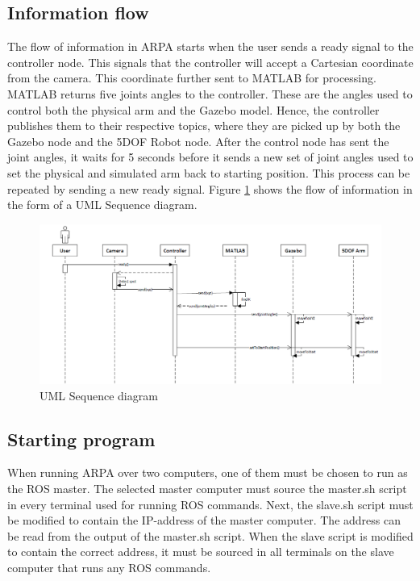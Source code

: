 \documentclass[11pt,a4paper, titlepage]{article}
\begin{document}
\subsection{Information flow}
The flow of information in ARPA starts when the user sends a ready signal to the controller node. This signals that the controller will accept a Cartesian coordinate from the camera. This coordinate  further sent to MATLAB for processing. MATLAB returns five joints angles to the controller. These are the angles used to control both the physical arm and the Gazebo model. Hence, the controller publishes them to their respective topics, where they are picked up by both the Gazebo node and the 5DOF Robot node. After the control node has sent the joint angles, it waits for 5 seconds before it sends a new set of joint angles used to set the physical and simulated arm back to starting position. This process can be repeated by sending a new ready signal. Figure \ref{fig:seq-diagram} shows the flow of information in the form of a UML Sequence diagram.
	
	
	\begin{figure}[H]
		\includegraphics[width=\linewidth]{../Diagrams/SequenceDiagram-v1.png}
		\caption{UML Sequence diagram}
		\label{fig:seq-diagram}
	\end{figure}
	
	\subsection{Starting program}
	\label{startup}
	
	When running ARPA over two computers, one of them must be chosen to run as the ROS master. The selected master computer must source the master.sh script in every terminal used for running ROS commands. Next, the slave.sh script must be modified to contain the IP-address of the master computer. The address can be read from the output of the master.sh script. When the slave script is modified to contain the correct address, it must be sourced in all terminals on the slave computer that runs any ROS commands.
	
\end{document}

